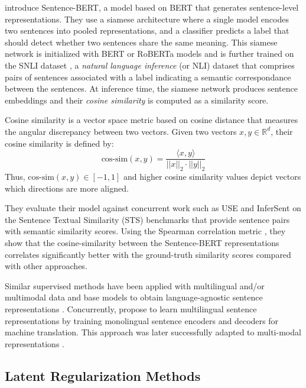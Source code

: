 \citet{reimers-gurevych-2019-sentence} introduce Sentence-BERT, a model based on BERT that generates sentence-level representations. They use a siamese architecture where a single model encodes two sentences into pooled representations, and a classifier predicts a label that should detect whether two sentences share the same meaning. This siamese network is initialized with BERT or RoBERTa models and is further trained on the SNLI dataset \citep{hill-etal-2016-learning}, a \textit{natural language inference} (or NLI) dataset that comprises pairs of sentences associated with a label indicating a semantic correspondance between the sentences. At inference time, the siamese network produces sentence embeddings and their \textit{cosine similarity} is computed as a similarity score.

Cosine similarity is a vector space metric based on cosine distance that measures the angular discrepancy between two vectors. Given two vectors $x, y \in \mathbb{R}^d$, their cosine similarity is defined by:
$$
\text{cos-sim}(x, y) = \frac{\langle x, y \rangle}{||x||_2 \cdot ||y||_2}
$$
Thus, $\text{cos-sim}(x, y) \in [-1, 1]$ and higher cosine similarity values depict vectors which directions are more aligned.

They evaluate their model against concurrent work such as USE \citep{cer-etal-2018-universal} and InferSent \citep{conneau-etal-2017-supervised} on the Sentence Textual Similarity (STS) benchmarks that provide sentence pairs with semantic similarity scores. Using the Spearman correlation metric \citep{zar2005spearman}, they show that the cosine-similarity between the Sentence-BERT representations correlates significantly better with the ground-truth similarity scores compared with other approaches.

Similar supervised methods have been applied with multilingual and/or multimodal data and base models to obtain language-agnostic sentence representations \citep{feng-etal-2022-language}. Concurrently, \citep{schwenk-douze-2017-learning} propose to learn multilingual sentence representations by training monolingual sentence encoders and decoders for machine translation. This approach was later successfully adapted to multi-modal representations \citep{Duquenne:2023:sonar_arxiv}.


\subsection{Latent Regularization Methods}

